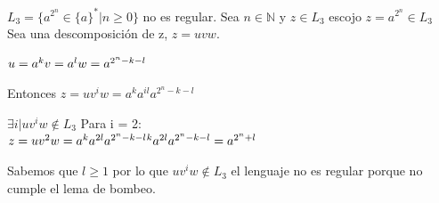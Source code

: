 \documentclass[12pt, spanish]{article}
\begin{document}
\begin{math}
L_{3} = \{ a^{2^{n}}\in \{ a\}^{*}| n \geq 0 \} 
\end{math} no es regular.
Sea \begin{math} n \in \mathbb{N} \end{math} y \begin{math} z \in L_{3} \end{math} escojo \begin{math} z = a^{2^{n}} \in L_{3}\end{math}\\

Sea una descomposición de z, \begin{math} z = uvw \end{math}.

\begin{math}
u = a^{k} \\
v = a^{l} \\
w = a^{2^{n}-k-l}\\
\end{math}

Entonces \begin{math}
z = uv^{i}w = a^{k}a^{il}a^{2^{n}-k-l}
\end{math}

\begin{math}
\exists i | uv^{i}w \notin L_{3}
\end{math}
Para i = 2:\\
\begin{math}
z = uv^{2}w = a^{k}a^{2l}a^{2^{n}-k-l}\\
^{k}a^{2l}a^{2^{n}-k-l} = a^{2^{n}+l}
\end{math}

Sabemos que \begin{math} l \geq 1 \end{math} por lo que \begin{math}uv^{i}w \notin L_{3}\end{math} el lenguaje no es regular porque no cumple el lema de bombeo.
\end{document}

